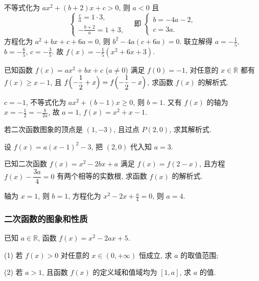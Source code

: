   \beginsolution
    不等式化为 $ax^2+(b+2)x+c>0$, 则 $a<0$ 且
    \[\left\{\!\!\begin{array}{l}
        \frac{c}a= 1\cdot 3,\\
        -\frac{b+2}a= 1+3,
      \end{array}\right.\quad\text{即\ }
      \left\{\!\!\begin{array}{l}
        b=-4a-2,\\
        c=3a.
      \end{array}\right.\]
    方程化为 $a^2+bx+c+6a=0$, 则 $b^2-4a(c+6a)=0$.
    联立解得 $a=-\frac15$, $b=-\frac65$, $c=-\frac35$. 故
    $f(x)=-\frac15(x^2+6x+3)$.
  \endsolution
  
  \begin{example}
    已知函数 $f(x)=ax^2 +bx+c$ ($a\neq 0$) 满足 $f(0)=-1$, 
    对任意的 $x\in \mathbb{R}$ 都有 $f(x)\geqslant x-1$,
    且 $f\Bigl(-\dfrac12+x\Bigr)= f\Bigl(-\dfrac12-x\Bigr)$, 
    求函数 $f(x)$ 的解析式.
  \end{example}

  \beginsolution
    $c=-1$, 不等式化为 $ax^2+(b-1)x\geqslant 0$, 则 $b=1$. 又有 $f(x)$ 的轴为 $x=-\frac12=-\frac{b}{2a}$, 故 $a=1$, $f(x)=x^2+x-1$.
  \endsolution
  
  \lianxi
  \begin{exercise}
    若二次函数图象的顶点是 $(1,-3)$, 且过点 $P(2,0)$, 求其解析式.
  \end{exercise}

  \beginsolution
    设 $f(x)=a(x-1)^2-3$, 把 $(2,0)$ 代入知 $a=3$.
  \endsolution
  
  \begin{exercise}
    已知二次函数 $f(x)=x^2 -2bx+a$ 满足 $f(x)=f(2-x)$,
    且方程 $f(x)-\dfrac{3a}4=0$ 有两个相等的实数根, 
    求函数 $f(x)$ 的解析式.
  \end{exercise}

  \beginsolution
    轴为 $x=1$, 则 $b=1$, 方程化为 $x^2-2x+\frac{a}4=0$, 则 $a=4$.
  \endsolution

  \subsubsection{二次函数的图象和性质}
  \begin{example}
    已知 $a\in \mathbb{R}$, 函数 $f(x)=x^2 -2ax+5$.
    
    (1) 若 $f(x)>0$ 对任意的 $x\in (0,+\infty)$ 恒成立,
    求 $a$ 的取值范围;
    
    (2) 若 $a>1$, 且函数 $f(x)$ 的定义域和值域均为 $[1,a]$, 求 $a$ 的值.
  \end{example}

